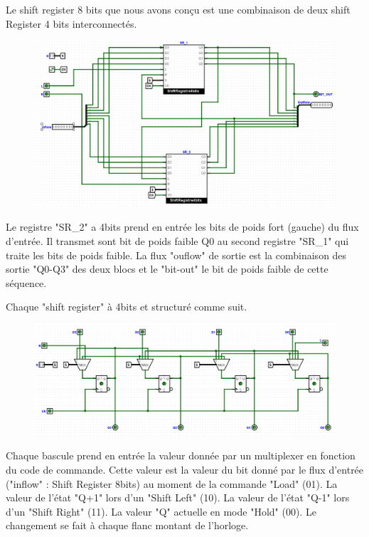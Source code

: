 \documentclass[a4paper]{article} %
\begin{document}
\begin{tcolorbox}[colframe=Monokaimagenta,colback=white, breakable, enhanced]
Le shift register 8 bits que nous avons conçu est une combinaison de deux shift Register 4 bits interconnectés. 
\begin{figure}[H]
	\centering
	\includegraphics[width=\textwidth]{src/SR_8b}
	\label{fig:SR_8b}
\end{figure}
Le registre "SR\_2" a 4bits prend en entrée les bits de poids fort (gauche) du flux d'entrée. Il transmet sont bit de poids faible Q0 au second registre "SR\_1" qui traite les bits de poids faible. La flux "ouflow" de sortie est la combinaison des sortie "Q0-Q3" des deux blocs et le "bit-out" le bit de poids faible de cette séquence.

Chaque "shift register" à 4bits et structuré comme suit.
\begin{figure}[H]
	\centering
	\includegraphics[width=\textwidth]{src/SR_4b}
	\label{fig:SR_4b}
\end{figure}
Chaque bascule prend en entrée la valeur donnée par un multiplexer en fonction du code de commande. Cette valeur est la valeur du bit donné par le flux d'entrée ("inflow" : Shift Register 8bits) au moment de la commande "Load" (01). La valeur de l'état "Q+1" lors d'un "Shift Left" (10). La valeur de l'état "Q-1" lors d'un "Shift Right" (11). La valeur "Q" actuelle en mode "Hold" (00). Le changement se fait à chaque flanc montant de l'horloge.
\end{tcolorbox}
\end{document}
